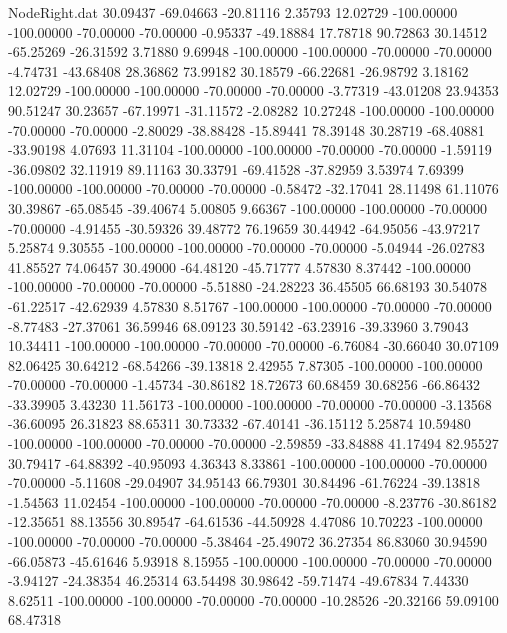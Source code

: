 \begin{filecontents}{NodeRight.dat}
  30.09437  -69.04663  -20.81116     2.35793   12.02729 -100.00000 -100.00000  -70.00000  -70.00000   -0.95337  -49.18884   17.78718   90.72863
  30.14512  -65.25269  -26.31592     3.71880    9.69948 -100.00000 -100.00000  -70.00000  -70.00000   -4.74731  -43.68408   28.36862   73.99182
  30.18579  -66.22681  -26.98792     3.18162   12.02729 -100.00000 -100.00000  -70.00000  -70.00000   -3.77319  -43.01208   23.94353   90.51247
  30.23657  -67.19971  -31.11572    -2.08282   10.27248 -100.00000 -100.00000  -70.00000  -70.00000   -2.80029  -38.88428  -15.89441   78.39148
  30.28719  -68.40881  -33.90198     4.07693   11.31104 -100.00000 -100.00000  -70.00000  -70.00000   -1.59119  -36.09802   32.11919   89.11163
  30.33791  -69.41528  -37.82959     3.53974    7.69399 -100.00000 -100.00000  -70.00000  -70.00000   -0.58472  -32.17041   28.11498   61.11076
  30.39867  -65.08545  -39.40674     5.00805    9.66367 -100.00000 -100.00000  -70.00000  -70.00000   -4.91455  -30.59326   39.48772   76.19659
  30.44942  -64.95056  -43.97217     5.25874    9.30555 -100.00000 -100.00000  -70.00000  -70.00000   -5.04944  -26.02783   41.85527   74.06457
  30.49000  -64.48120  -45.71777     4.57830    8.37442 -100.00000 -100.00000  -70.00000  -70.00000   -5.51880  -24.28223   36.45505   66.68193
  30.54078  -61.22517  -42.62939     4.57830    8.51767 -100.00000 -100.00000  -70.00000  -70.00000   -8.77483  -27.37061   36.59946   68.09123
  30.59142  -63.23916  -39.33960     3.79043   10.34411 -100.00000 -100.00000  -70.00000  -70.00000   -6.76084  -30.66040   30.07109   82.06425
  30.64212  -68.54266  -39.13818     2.42955    7.87305 -100.00000 -100.00000  -70.00000  -70.00000   -1.45734  -30.86182   18.72673   60.68459
  30.68256  -66.86432  -33.39905     3.43230   11.56173 -100.00000 -100.00000  -70.00000  -70.00000   -3.13568  -36.60095   26.31823   88.65311
  30.73332  -67.40141  -36.15112     5.25874   10.59480 -100.00000 -100.00000  -70.00000  -70.00000   -2.59859  -33.84888   41.17494   82.95527
  30.79417  -64.88392  -40.95093     4.36343    8.33861 -100.00000 -100.00000  -70.00000  -70.00000   -5.11608  -29.04907   34.95143   66.79301
  30.84496  -61.76224  -39.13818    -1.54563   11.02454 -100.00000 -100.00000  -70.00000  -70.00000   -8.23776  -30.86182  -12.35651   88.13556
  30.89547  -64.61536  -44.50928     4.47086   10.70223 -100.00000 -100.00000  -70.00000  -70.00000   -5.38464  -25.49072   36.27354   86.83060
  30.94590  -66.05873  -45.61646     5.93918    8.15955 -100.00000 -100.00000  -70.00000  -70.00000   -3.94127  -24.38354   46.25314   63.54498
  30.98642  -59.71474  -49.67834     7.44330    8.62511 -100.00000 -100.00000  -70.00000  -70.00000  -10.28526  -20.32166   59.09100   68.47318

\end{filecontents}
